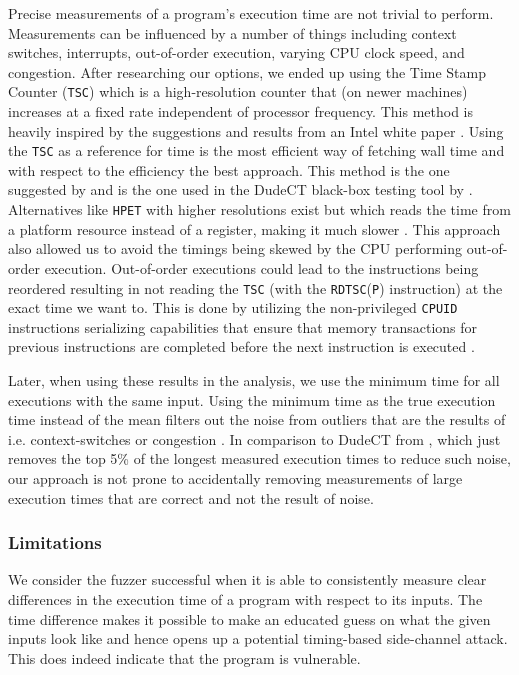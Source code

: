 Precise measurements of a program's execution time are not trivial to perform. 
Measurements can be influenced by a number of things including context switches, interrupts, out-of-order execution, varying CPU clock speed, and congestion. 
After researching our options, we ended up using the Time Stamp Counter (\texttt{TSC}) which is a high-resolution counter that (on newer machines) increases at a fixed rate independent of processor frequency. 
This method is heavily inspired by the suggestions and results from an Intel white paper \citep{intel-benchmark-code-execution}.
Using the \texttt{TSC} as a reference for time is the most efficient way of fetching wall time and with respect to the efficiency the best approach.
This method is the one suggested by \citep{intel-benchmark-code-execution} and is the one used in the DudeCT black-box testing tool by \citep{dudect}.
Alternatives like \texttt{HPET} with higher resolutions exist but which reads the time from a platform resource instead of a register, making it much slower \citep[b]{intel-reference}.
This approach also allowed us to avoid the timings being skewed by the CPU performing out-of-order execution.
Out-of-order executions could lead to the instructions being reordered resulting in not reading the \texttt{TSC} (with the \texttt{RDTSC}(\texttt{P}) instruction) at the exact time we want to. 
This is done by utilizing the non-privileged \texttt{CPUID} instructions serializing capabilities that ensure that memory transactions for previous instructions are completed before the next instruction is executed \citep[a]{intel-reference}.

Later, when using these results in the analysis, we use the minimum time for all executions with the same input.
Using the minimum time as the true execution time instead of the mean filters out the noise from outliers that are the results of i.e. context-switches or congestion \citep{robust-benchmarking}. 
In comparison to DudeCT from \citep{dudect}, which just removes the top 5\% of the longest measured execution times to reduce such noise, our approach is not prone to accidentally removing measurements of large execution times that are correct and not the result of noise.

\subsubsection{Limitations}
We consider the fuzzer successful when it is able to consistently measure clear differences in the execution time of a program with respect to its inputs. 
The time difference makes it possible to make an educated guess on what the given inputs look like and hence opens up a potential timing-based side-channel attack. 
This does indeed indicate that the program is vulnerable.


